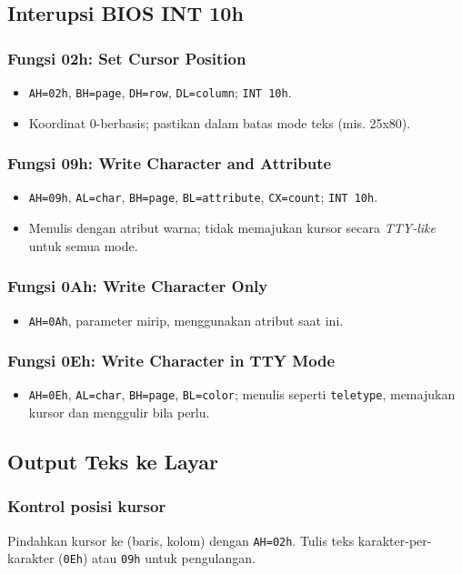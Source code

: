 \documentclass[../main.tex]{subfiles}
\begin{document}
\subsection{Interupsi BIOS INT 10h}
\subsubsection{Fungsi 02h: Set Cursor Position}
\begin{itemize}
  \item \texttt{AH=02h}, \texttt{BH=page}, \texttt{DH=row}, \texttt{DL=column}; \texttt{INT 10h}.
  \item Koordinat 0-berbasis; pastikan dalam batas mode teks (mis. 25x80).
\end{itemize}
\subsubsection{Fungsi 09h: Write Character and Attribute}
\begin{itemize}
  \item \texttt{AH=09h}, \texttt{AL=char}, \texttt{BH=page}, \texttt{BL=attribute}, \texttt{CX=count}; \texttt{INT 10h}.
  \item Menulis dengan atribut warna; tidak memajukan kursor secara \textit{TTY-like} untuk semua mode.
\end{itemize}
\subsubsection{Fungsi 0Ah: Write Character Only}
\begin{itemize}
  \item \texttt{AH=0Ah}, parameter mirip, menggunakan atribut saat ini.
\end{itemize}
\subsubsection{Fungsi 0Eh: Write Character in TTY Mode}
\begin{itemize}
  \item \texttt{AH=0Eh}, \texttt{AL=char}, \texttt{BH=page}, \texttt{BL=color}; menulis seperti \texttt{teletype}, memajukan kursor dan menggulir bila perlu.
\end{itemize}

\subsection{Output Teks ke Layar}
\subsubsection{Kontrol posisi kursor}
Pindahkan kursor ke (baris, kolom) dengan \texttt{AH=02h}. Tulis teks karakter-per-karakter (\texttt{0Eh}) atau \texttt{09h} untuk pengulangan.
\end{document}
